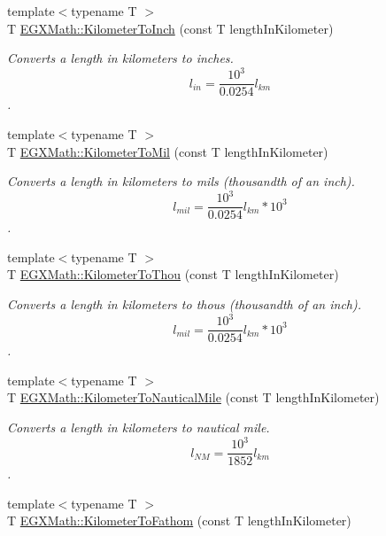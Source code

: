 \begin{DoxyCompactItemize}
{\footnotesize template$<$typename T $>$ }\\T \mbox{\hyperlink{group___e_g_x_math-_conversions-_length_conversions-_s_i-_kilometer-_imperial_ga6f1d41be3b2039495abff4f256148aa7}{E\+G\+X\+Math\+::\+Kilometer\+To\+Inch}} (const T length\+In\+Kilometer)
\begin{DoxyCompactList}\small\item\em Converts a length in kilometers to inches. \[ l_{in}= \frac{10^{3}}{0.0254} l_{km} \]. \end{DoxyCompactList}\item 
{\footnotesize template$<$typename T $>$ }\\T \mbox{\hyperlink{group___e_g_x_math-_conversions-_length_conversions-_s_i-_kilometer-_imperial_ga4d25c16818235ceaad64d1119e23e01f}{E\+G\+X\+Math\+::\+Kilometer\+To\+Mil}} (const T length\+In\+Kilometer)
\begin{DoxyCompactList}\small\item\em Converts a length in kilometers to mils (thousandth of an inch). \[ l_{mil}= \frac{10^{3}}{0.0254} l_{km} * 10^{3} \]. \end{DoxyCompactList}\item 
{\footnotesize template$<$typename T $>$ }\\T \mbox{\hyperlink{group___e_g_x_math-_conversions-_length_conversions-_s_i-_kilometer-_imperial_gabcd7d2e467bc0e80c61257ba641d0f48}{E\+G\+X\+Math\+::\+Kilometer\+To\+Thou}} (const T length\+In\+Kilometer)
\begin{DoxyCompactList}\small\item\em Converts a length in kilometers to thous (thousandth of an inch). \[ l_{mil}= \frac{10^{3}}{0.0254} l_{km} * 10^{3} \]. \end{DoxyCompactList}\item 
{\footnotesize template$<$typename T $>$ }\\T \mbox{\hyperlink{group___e_g_x_math-_conversions-_length_conversions-_s_i-_kilometer-_nautical_ga4571f464f551ae965f88192b53dd24ff}{E\+G\+X\+Math\+::\+Kilometer\+To\+Nautical\+Mile}} (const T length\+In\+Kilometer)
\begin{DoxyCompactList}\small\item\em Converts a length in kilometers to nautical mile. \[ l_{NM}= \frac{10^{3}}{1852} l_{km} \]. \end{DoxyCompactList}\item 
{\footnotesize template$<$typename T $>$ }\\T \mbox{\hyperlink{group___e_g_x_math-_conversions-_length_conversions-_s_i-_kilometer-_nautical_gaaecd42afaeaadc41e885dbf49bebae83}{E\+G\+X\+Math\+::\+Kilometer\+To\+Fathom}} (const T length\+In\+Kilometer)

\end{DoxyCompactItemize}

